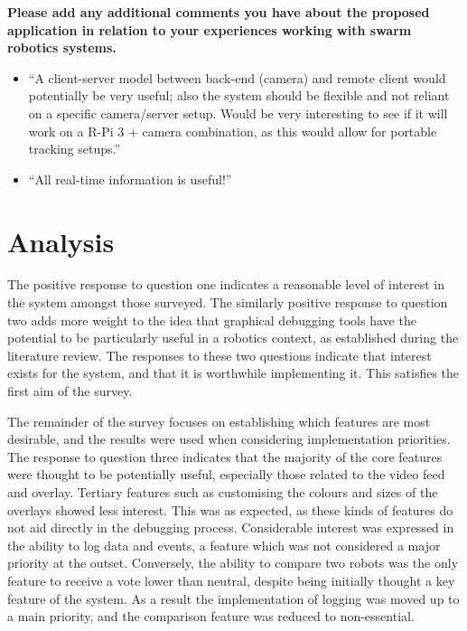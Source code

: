 \noindent\textbf{Please add any additional comments you have about the proposed application in relation to your experiences working with swarm robotics systems.}

\begin{itemize}
\item ``A client-server model between back-end (camera) and remote client would potentially be very useful; also the system should be flexible and not reliant on a specific camera/server setup. Would be very interesting to see if it will work on a R-Pi 3 + camera combination, as this would allow for portable tracking setups.''
\item ``All real-time information is useful!''
\end{itemize}


\section{Analysis}
The positive response to question one indicates a reasonable level of interest in the system amongst those surveyed. The similarly positive response to question two adds more weight to the idea that graphical debugging tools have the potential to be particularly useful in a robotics context, as established during the literature review. The responses to these two questions indicate that interest exists for the system, and that it is worthwhile implementing it. This satisfies the first aim of the survey.

The remainder of the survey focuses on establishing which features are most desirable, and the results were used when considering implementation priorities. The response to question three indicates that the majority of the core features were thought to be potentially useful, especially those related to the video feed and overlay. Tertiary features such as customising the colours and sizes of the overlays showed less interest. This was as expected, as these kinds of features do not aid directly in the debugging process. Considerable interest was expressed in the ability to log data and events, a feature which was not considered a major priority at the outset. Conversely, the ability to compare two robots was the only feature to receive a vote lower than neutral, despite being initially thought a key feature of the system. As a result the implementation of logging was moved up to a main priority, and the comparison feature was reduced to non-essential.

